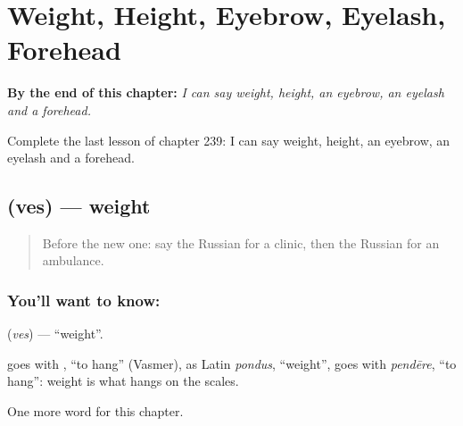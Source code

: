 
\chapter{Weight, Height, Eyebrow, Eyelash, Forehead}
\label{ch:ru-weight-height-eyebrow-eyelash-forehead}

\begin{chapteropening}
\textbf{By the end of this chapter:} \emph{I can say weight, height, an eyebrow, an eyelash and a forehead.}

Complete the last lesson of chapter 239: I can say weight, height, an eyebrow, an eyelash and a forehead.
\end{chapteropening}

\section[\texorpdfstring{\ru{вес} (ves)}{вес (ves)}]{ (ves) — weight}

\label{lesson:RU-C239-ves}



\begin{quote}
Before the new one: say the Russian for a clinic, then the Russian for an ambulance.
\end{quote}

\subsection*{You'll want to know: }
\textbf{} (\emph{ves}) — \textquotedblleft{}weight\textquotedblright{}.

\begin{cousinweb}
\textbf{} goes with \emph{}, \textquotedblleft{}to hang\textquotedblright{} (Vasmer), as Latin \emph{pondus}, \textquotedblleft{}weight\textquotedblright{}, goes with \emph{pendēre}, \textquotedblleft{}to hang\textquotedblright{}: weight is what hangs on the scales.
\end{cousinweb}

\begin{grammarlens}[title={What you've built}]
One more word for this chapter.
\end{grammarlens}

